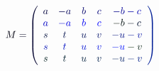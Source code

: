 \documentclass[12pt]{article}
\begin{document}
\makeatletter
\renewcommand*{\@textcolor}[3]{%
  \protect\leavevmode
  \begingroup
    \color#1{#2}#3%
  \endgroup
}
\makeatother
\begin{displaymath}
\mathcolor[RGB]{0,0,15}{M} \mathcolor[RGB]{0,0,30}{=} \mathcolor[RGB]{0,0,45}{\left(} \begin{array} {ccccc} { \mathcolor[RGB]{0,0,60}{a} } & { \mathcolor[RGB]{0,0,75}{-} \mathcolor[RGB]{0,0,90}{a} } & { \mathcolor[RGB]{0,0,105}{b} } & { \mathcolor[RGB]{0,0,120}{c} } & { \mathcolor[RGB]{0,0,135}{-} \mathcolor[RGB]{0,0,150}{b} \mathcolor[RGB]{0,0,165}{-} \mathcolor[RGB]{0,0,180}{c} } \\ { \mathcolor[RGB]{0,0,195}{a} } & { \mathcolor[RGB]{0,0,210}{-} \mathcolor[RGB]{0,0,225}{a} } & { \mathcolor[RGB]{0,0,240}{b} } & { \mathcolor[RGB]{0,0,255}{c} } & { \mathcolor[RGB]{0,15,0}{-} \mathcolor[RGB]{0,15,15}{b} \mathcolor[RGB]{0,15,30}{-} \mathcolor[RGB]{0,15,45}{c} } \\ { \mathcolor[RGB]{0,15,60}{s} } & { \mathcolor[RGB]{0,15,75}{t} } & { \mathcolor[RGB]{0,15,90}{u} } & { \mathcolor[RGB]{0,15,105}{v} } & { \mathcolor[RGB]{0,15,120}{-} \mathcolor[RGB]{0,15,135}{u} \mathcolor[RGB]{0,15,150}{-} \mathcolor[RGB]{0,15,165}{v} } \\ { \mathcolor[RGB]{0,15,180}{s} } & { \mathcolor[RGB]{0,15,195}{t} } & { \mathcolor[RGB]{0,15,210}{u} } & { \mathcolor[RGB]{0,15,225}{v} } & { \mathcolor[RGB]{0,15,240}{-} \mathcolor[RGB]{0,15,255}{u} \mathcolor[RGB]{0,30,0}{-} \mathcolor[RGB]{0,30,15}{v} } \\ { \mathcolor[RGB]{0,30,30}{s} } & { \mathcolor[RGB]{0,30,45}{t} } & { \mathcolor[RGB]{0,30,60}{u} } & { \mathcolor[RGB]{0,30,75}{v} } & { \mathcolor[RGB]{0,30,90}{-} \mathcolor[RGB]{0,30,105}{u} \mathcolor[RGB]{0,30,120}{-} \mathcolor[RGB]{0,30,135}{v} } \end{array} \mathcolor[RGB]{0,30,150}{\right)}
\end{displaymath}
\end{document}
